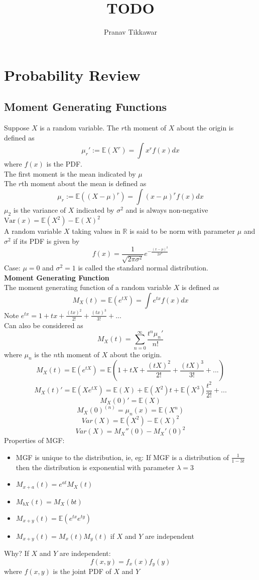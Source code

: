 \documentclass{article}
\author{Pranav Tikkawar}
\title{TODO}
\newcommand{\expec}[1]{\mathds{E}(#1)}
\newcommand{\var}[1]{\text{Var}(#1)}
\begin{document}
\maketitle

\section{Probability Review}
\subsection*{Moment Generating Functions}
Suppose $X$ is a random variable. The $r$th moment of $X$ about the origin is defined as
$$\mu_r' := \expec{X^r} = \int x^r f(x) dx$$
where $f(x)$ is the PDF. \\
The first moment is the mean indicated by $\mu$ \\
The $r$th moment about the mean is defined as
$$ \mu_r := \expec{(X - \mu)^r} = \int (x - \mu)^r f(x) dx$$
$\mu_2$ is the variance of $X$ indicated by $\sigma^2$ and is always non-negative \\
$\var{x} = \expec{X^2} - \expec{X}^2$ \\
A random variable $X$ taking values in $\mathds{R}$ is said to be norm with parameter $\mu$ and $\sigma^2$ if its PDF is given by
$$f(x) = \frac{1}{\sqrt{2\pi \sigma^2}} e^{-\frac{(x - \mu)^2}{2\sigma^2}}$$
Case: $\mu = 0$ and $\sigma^2 = 1$ is called the standard normal distribution. \\
\textbf{Moment Generating Function} \\
The moment generating function of a random variable $X$ is defined as 
$$M_X(t) = \expec{e^{tX}} = \int e^{tx} f(x)dx $$
Note $e^{tx} = 1 + tx + \frac{(tx)^2}{2!} + \frac{(tx)^3}{3!} + ...$ \\
Can also be considered as 
$$ M_X(t) = \sum_{n=0}^{\infty} \frac{t^n \mu_n'}{n!}$$
where $\mu_n$ is the $n$th moment of $X$ about the origin. \\
$$M_X(t) = \expec{e^{tX}} = \expec{1 + tX + \frac{(tX)^2}{2!} + \frac{(tX)^3}{3!} + ...}$$
$$M_X(t)' = \expec{Xe^{tX}} = \expec{X} + \expec{X^2}t + \expec{X^3}\frac{t^2}{2!} + ...$$
$$M_X(0)' = \expec{X} $$
$$M_X(0)^{(n)} = \mu_n(x) = \expec{X^n}$$
$$Var(X) = \expec{X^2} - \expec{X}^2$$
$$Var(X) = M_X''(0) - M_X'(0)^2$$
Properties of MGF:
\begin{itemize}
\item MGF is unique to the distribution, ie, eg: If MGF is a distribution of $\frac{1}{1-3t}$ then the distribution is exponential with parameter $\lambda = 3$
\item $M_{x+a}(t) = e^{at}M_X(t)$
\item $M_{bX}(t) = M_X(bt)$
\item $M_{x + y}(t) = \mathds{E}(e^{tx}e^{ty})$
\item $M_{x + y}(t) = M_x(t)M_y(t)$ if $X$ and $Y$ are independent
\end{itemize}
Why? If $X$ and $Y$ are independent: 
$$ f(x,y) = f_x(x)f_y(y)$$
where $f(x,y)$ is the joint PDF of $X$ and $Y$ \\
\end{document}
